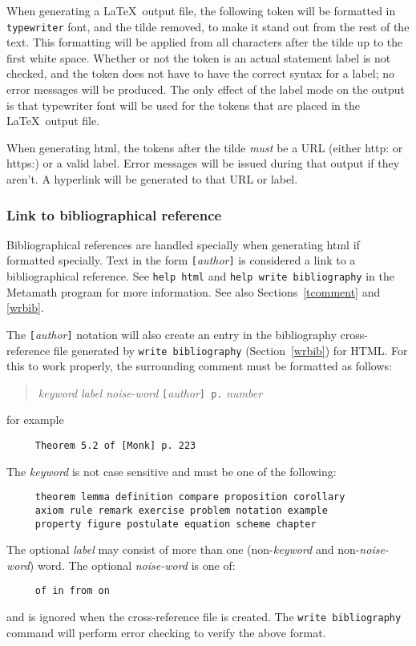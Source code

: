 When generating a \LaTeX\ output file,
the following token will be formatted in \texttt{typewriter}
font, and the tilde removed, to make it stand out from the rest of the text.
This formatting will be applied from all characters after the
tilde up to the first white space.
Whether
or not the token is an actual statement label is not checked, and the
token does not have to have the correct syntax for a label; no error
messages will be produced.  The only effect of the label mode on the
output is that typewriter font will be used for the tokens that are
placed in the \LaTeX\ output file.

When generating {\sc html},
the tokens after the tilde {\em must} be a URL (either http: or https:)
or a valid label.
Error messages will be issued during that output if they aren't.
A hyperlink will be generated to that URL or label.

\subsubsection{Link to bibliographical reference}%

Bibliographical references are handled specially when generating
{\sc html} if formatted specially.
Text in the form \texttt{[}{\em author}\texttt{]}
is considered a link to a bibliographical reference.
See \texttt{help html} and \texttt{help write
bibliography} in the Metamath program for more
information.
See also Sections~\ref{tcomment} and \ref{wrbib}.

The \texttt{[}{\em author}\texttt{]} notation will also create an entry in
the bibliography cross-reference file generated by \texttt{write
bibliography} (Section~\ref{wrbib}) for HTML.  For this to work properly, the
surrounding comment must be formatted as follows:
\begin{quote}
    {\em keyword} {\em label} {\em noise-word}
     \texttt{[}{\em author}\texttt{] p.} {\em number}
\end{quote}
for example
\begin{verbatim}
     Theorem 5.2 of [Monk] p. 223
\end{verbatim}
The {\em keyword} is not case sensitive and must be one of the following:
\begin{verbatim}
     theorem lemma definition compare proposition corollary
     axiom rule remark exercise problem notation example
     property figure postulate equation scheme chapter
\end{verbatim}
The optional {\em label} may consist of more than one
(non-{\em keyword} and non-{\em noise-word}) word.
The optional {\em noise-word} is one of:
\begin{verbatim}
     of in from on
\end{verbatim}
and is  ignored when the cross-reference file is created.  The
\texttt{write
biblio\-graphy} command will perform error checking to verify the
above format.

